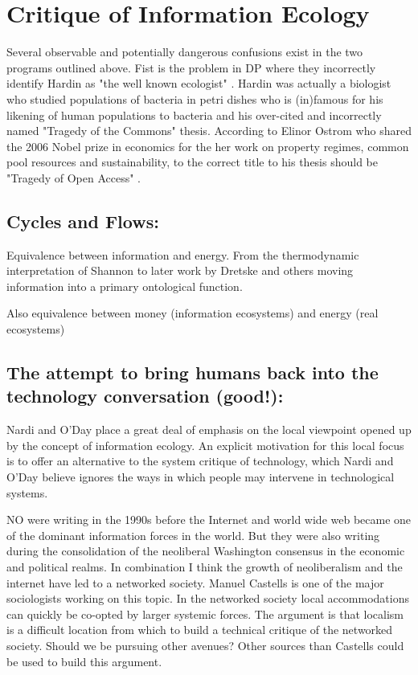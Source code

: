 \section{Critique of Information Ecology}

Several observable and potentially dangerous confusions exist in the two programs outlined above. Fist is the problem in DP where they incorrectly identify Hardin as "the well known ecologist" \cite[][p. 28]{davenport_information_1997}. Hardin was actually a biologist who studied populations of bacteria in petri dishes who is (in)famous for his likening of human populations to bacteria and his over-cited and incorrectly named "Tragedy of the Commons" thesis. According to Elinor Ostrom who shared the 2006 Nobel prize in economics for the her work on property regimes, common pool resources and sustainability, to the correct title to his thesis should be "Tragedy of Open Access" \cite{ostrom_2007}.

\subsection{Cycles and Flows:}

Equivalence between information and energy. From the thermodynamic interpretation of Shannon to later work by Dretske and others moving information into a primary ontological function.

Also equivalence between money (information ecosystems) and energy (real ecosystems)

\subsection{The attempt to bring humans back into the technology conversation (good!):}

Nardi and O'Day place a great deal of emphasis on the local viewpoint opened up by the concept of information ecology. An explicit motivation for this local focus is to offer an alternative to the system critique of technology, which Nardi and O'Day believe ignores the ways in which people may intervene in technological systems.

NO were writing in the 1990s before the Internet and world wide web became one of the dominant information forces in the world. But they were also writing during the consolidation of the neoliberal Washington consensus in the economic and political realms. In combination I think the growth of neoliberalism and the internet have led to a networked society. Manuel Castells is one of the major sociologists working on this topic. In the networked society local accommodations can quickly be co-opted by larger systemic forces. The argument is that localism is a difficult location from which to build a technical critique of the networked society. Should we be pursuing other avenues? Other sources than Castells could be used to build this argument.

